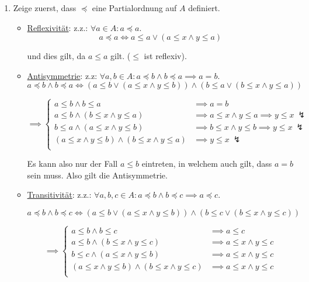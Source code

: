 \documentclass[12pt]{article}
\begin{document}
\begin{enumerate}[label=(\alph*)]
    \item Zeige zuerst, dass $\preceq$ eine Partialordnung auf $A$ definiert.
    \begin{itemize}
        \item \underline{Reflexivität}: z.z.: $\forall a \in A : a \preceq a$.
        $$
            a \preceq a \iff a \leq a \lor (a \leq x \land y \leq a)
        $$

        und dies gilt, da $a \leq a$ gilt. ($\leq$ ist reflexiv).
        
        \item \underline{Antisymmetrie}: z.z: $\forall a, b \in A : a \preceq b \land b \preceq a \implies a = b$.
        $$
            a \preceq b \land b \preceq a \iff \left(a \leq b \lor (a \leq x \land y \leq b)\right) \land \left(b \leq a \lor (b \leq x \land y \leq a)\right)
        $$

        $$
            \implies \begin{cases}
                a \leq b \land b \leq a & \implies a = b \\
                a \leq b \land (b \leq x \land y \leq a) & \implies a \leq x \land y \leq a \implies y \leq x \ \lightning \\
                b \leq a \land (a \leq x \land y \leq b) & \implies b \leq x \land y \leq b \implies y \leq x \ \lightning \\
                (a \leq x \land y \leq b) \land (b \leq x \land y \leq a) & \implies y \leq x \ \lightning \\
            \end{cases}
        $$

        Es kann also nur der Fall $a \leq b$ eintreten, in welchem auch gilt, dass $a = b$ sein muss. Also gilt die Antisymmetrie.

        \item \underline{Transitivität}: z.z.: $\forall a, b, c \in A : a \preceq b \land b \preceq c \implies a \preceq c$.
        
        $$
            a \preceq b \land b \preceq c \iff \left(a \leq b \lor (a \leq x \land y \leq b)\right) \land \left(b \leq c \lor (b \leq x \land y \leq c)\right)
        $$

        $$
            \implies \begin{cases}
                a \leq b \land b \leq c & \implies a \leq c \\
                a \leq b \land (b \leq x \land y \leq c) & \implies a \leq x \land y \leq c \\
                b \leq c \land (a \leq x \land y \leq b) & \implies a \leq x \land y \leq c \\
                (a \leq x \land y \leq b) \land (b \leq x \land y \leq c) & \implies a \leq x \land y \leq c \\
            \end{cases}
        $$


\end{itemize}
\end{enumerate}
\end{document}
